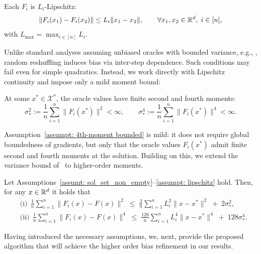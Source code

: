 \begin{assumption}\label{assumpt: lipschitz}
Each $F_i$ is $L_i$-Lipschitz:
\[
\|F_i(x_1)-F_i(x_2)\| \le L_i\|x_1-x_2\|,
\qquad \forall x_1,x_2\in\mathbb{R}^d,\; i\in[n],
\]
with $L_{\max}=\max_{i\in[n]}L_i$.
\end{assumption}
\vspace{-0.4em}
Unlike standard analyses assuming unbiased oracles with bounded variance, e.g., \citep{loizou2021stochastic,hsieh2019convergence,lin2020finite,mishchenko2020revisiting},
random reshuffling induces bias via inter-step dependence.  
Such conditions may fail even for simple quadratics.  
Instead, we work directly with Lipschitz continuity and impose only a mild moment bound:
\begin{assumption}\label{assumpt: 4th-moment bounded}
At some $x^*\in\mathcal{X}^*$, the oracle values have finite second and fourth moments:
\[
\sigma_*^2:=\frac{1}{n}\sum_{i=1}^n\|F_i(x^*)\|^2<\infty,
\qquad 
\sigma_*^4:=\frac{1}{n}\sum_{i=1}^n\|F_i(x^*)\|^4<\infty.
\]
\end{assumption}
\vspace{-0.3em}
Assumption~\ref{assumpt: 4th-moment bounded} is mild: it does not require global boundedness of gradients, but only that the oracle values $F_i(x^*)$ admit finite second and fourth moments at the solution.  
Building on this, we extend the variance bound of~\citet[Prop.~A.2, p.~16]{emmanouilidis2024stochastic} to higher-order moments.  
\begin{proposition}\label{prop}
Let Assumptions~\ref{assumt: sol_set_non_empty}--\ref{assumpt: lipschitz} hold. Then, for any $x\in\mathbb{R}^d$ it holds that
\begin{align*}
&\text{(i)}~~\frac1n\sum_{i=1}^n \|F_i(x)-F(x)\|^2
\;\le\;
\frac2n\sum_{i=1}^n L_i^2\|x-x^*\|^2 \;+\; 2\sigma_*^2,\\[0.5em]
&\text{(ii)}~~\frac1n\sum_{i=1}^n \|F_i(x)-F(x)\|^4
\;\le\;
\frac{128}{n}\sum_{i=1}^n L_i^4 \|x-x^*\|^4 \;+\; 128\sigma_*^4.
\end{align*}
\end{proposition}
Having introduced the necessary assumptions, we, next, provide the proposed algorithm that will achieve the higher order bias refinement in our results.

